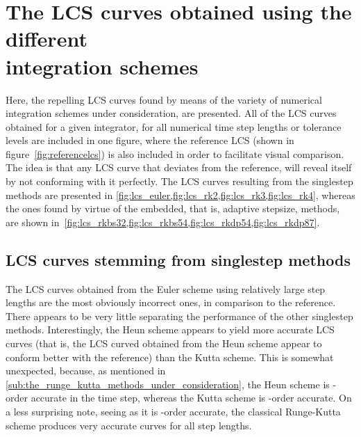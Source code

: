\section[The LCS curves obtained using the different integration schemes]
{The LCS curves obtained using the different\\\phantom{4.1 }integration schemes}
\label{sec:the_lcs_curves_obtained_using_the_different_schemes}

Here, the repelling LCS curves found by means of the variety of
numerical integration schemes under consideration, are presented. All of the
LCS curves obtained for a given integrator, for all numerical time step lengths
or tolerance levels are included in one figure, where the reference LCS (shown
in figure~\ref{fig:referencelcs}) is also included in order to
facilitate visual comparison. The idea is that any LCS curve that deviates
from the reference, will reveal itself by not conforming with it perfectly. The
LCS curves resulting from the singlestep methods are presented in
\cref{fig:lcs_euler,fig:lcs_rk2,fig:lcs_rk3,fig:lcs_rk4}, whereas the ones
found by virtue of the embedded, that is, adaptive stepsize, methods, are
shown in~\cref{fig:lcs_rkbs32,fig:lcs_rkbs54,fig:lcs_rkdp54,fig:lcs_rkdp87}.

\subsection{LCS curves stemming from singlestep methods}
\label{sub:lcs_curves_stemming_from_singlestep_methods}








The LCS curves obtained from the Euler scheme using relatively large step
lengths are the most obviously incorrect ones, in comparison to the reference.
There appears to be very little separating the performance of the other
singlestep methods. Interestingly, the Heun scheme appears to yield more
accurate LCS curves (that is, the LCS curved obtained from the Heun scheme
appear to conform better with the reference) than the Kutta scheme.
This is somewhat unexpected, because, as mentioned in
\cref{sub:the_runge_kutta_methods_under_consideration}, the Heun scheme is
-order accurate in the time step, whereas the Kutta scheme is
-order accurate. On a less surprising note, seeing as it is -order
accurate, the classical Runge-Kutta scheme produces very accurate curves for
all step lengths.

